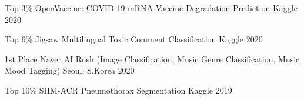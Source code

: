 
\begin{cvhonors}

  \cvhonor
    {Top 3\%} %
    {OpenVaccine: COVID-19 mRNA Vaccine Degradation Prediction} %
    {Kaggle} %
    {2020} %

  \cvhonor
    {Top 6\%} %
    {Jigsaw Multilingual Toxic Comment Classification} %
    {Kaggle} %
    {2020} %

  \cvhonor
    {1st Place} %
    {Naver AI Rush (Image Classification, Music Genre Classification, Music Mood Tagging)} %
    {Seoul, S.Korea} %
    {2020} %

  \cvhonor
    {Top 10\%} %
    {SIIM-ACR Pneumothorax Segmentation} %
    {Kaggle} %
    {2019} %

\end{cvhonors}